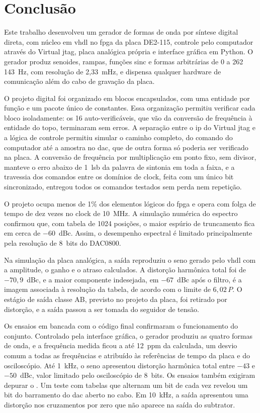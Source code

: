 \chapter{Conclusão}\label{cap:conclusao}

Este trabalho desenvolveu um gerador de formas de onda por síntese digital direta, com núcleo em \ac{vhdl} no \ac{fpga} da placa DE2-115, controle pelo computador através do Virtual \ac{jtag}, placa analógica própria e interface gráfica em Python. O gerador produz senoides, rampas, funções sinc e formas arbitrárias de 0 a 262\,143~Hz, com resolução de 2,33~mHz, e dispensa qualquer hardware de comunicação além do cabo de gravação da placa.

O projeto digital foi organizado em blocos encapsulados, com uma entidade por função e um pacote único de constantes. Essa organização permitiu verificar cada bloco isoladamente: os 16  auto-verificáveis, que vão da conversão de frequência à entidade do topo, terminaram sem erros. A separação entre o \ac{ip} do Virtual \ac{jtag} e a lógica de controle permitiu simular o caminho completo, do comando do computador até a amostra no \ac{dac}, que de outra forma só poderia ser verificado na placa. A conversão de frequência por multiplicação em ponto fixo, sem divisor, manteve o erro abaixo de 1~\ac{lsb} da palavra de sintonia em toda a faixa, e a travessia dos comandos entre os domínios de clock, feita com um único bit sincronizado, entregou todos os comandos testados sem perda nem repetição.

O projeto ocupa menos de 1\% dos elementos lógicos do \ac{fpga} e opera com folga de tempo de dez vezes no clock de 10~MHz. A simulação numérica do espectro confirmou que, com tabela de 1024 posições, o maior espúrio de truncamento fica em cerca de \(-60\)~dBc. Assim, o desempenho espectral é limitado principalmente pela resolução de 8~bits do DAC0800.

Na simulação da placa analógica, a saída reproduziu o seno gerado pelo \ac{vhdl} com a amplitude, o ganho e o atraso calculados. A distorção harmônica total foi de \(-70{,}9\)~dBc, e a maior componente indesejada, em \(-67\)~dBc após o filtro, é a imagem associada à resolução da tabela, de acordo com o limite de \(6{,}02\,P\). O estágio de saída classe AB, previsto no projeto da placa, foi retirado por distorção, e a saída passou a ser tomada do seguidor de tensão.

Os ensaios em bancada com o código final confirmaram o funcionamento do conjunto. Controlado pela interface gráfica, o gerador produziu as quatro formas de onda, e a frequência medida ficou a até 12~ppm da calculada, um desvio comum a todas as frequências e atribuído às referências de tempo da placa e do osciloscópio. Até 1~kHz, o seno apresentou distorção harmônica total entre \(-43\) e \(-50\)~dBc, valor limitado pelo osciloscópio de 8~bits. Os ensaios também exigiram depurar o . Um teste com tabelas que alternam um bit de cada vez revelou um bit do barramento do \acs{dac} aberto no cabo. Em 10~kHz, a saída apresentou uma distorção nos cruzamentos por zero que não aparece na saída do subtrator.

